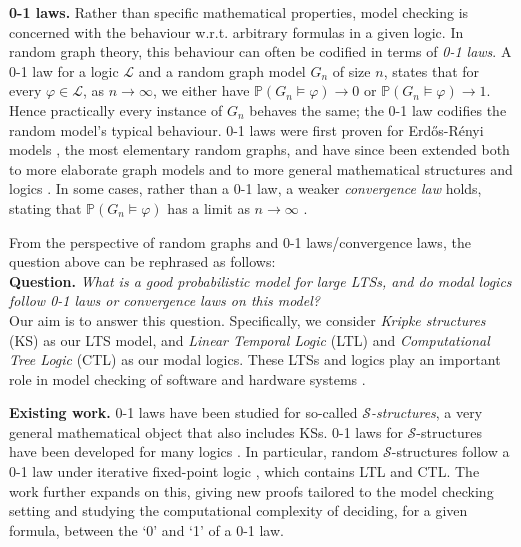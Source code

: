 \documentclass[runngingheads]{llncs}
\begin{document}
\noindent \textbf{0-1 laws.} Rather than specific mathematical properties, model checking is concerned with the behaviour w.r.t. arbitrary formulas in a given logic. In random graph theory, this behaviour can often be codified in terms of \emph{0-1 laws}. A 0-1 law for a logic $\mathcal{L}$ and a random graph model $G_n$ of size $n$, states that for every $\varphi \in \mathcal{L}$, as $n \rightarrow \infty$, we either have $\mathbb{P}(G_n \models \varphi) \rightarrow 0$ or $\mathbb{P}(G_n \models \varphi) \rightarrow 1$. Hence practically every instance of $G_n$ behaves the same; the 0-1 law codifies the random model's typical behaviour. 0-1 laws were first proven for Erd\H{o}s-Rényi models \cite{fagin1976probabilities}, the most elementary random graphs, and have since been extended both to more elaborate graph models \cite{shelah1988zero} and to more general mathematical structures and logics \cite{KOLAITIS1992258}. In some cases, rather than a 0-1 law,  a weaker \emph{convergence law} holds, stating that $\mathbb{P}(G_n \models \varphi)$ has a limit as $n \rightarrow \infty$ \cite{lynch2005convergence}.

From the perspective of random graphs and 0-1 laws/convergence laws, the question above can be rephrased as follows:\\

\noindent \textbf{Question.} \emph{What is a good probabilistic model for large LTSs, and do modal logics follow 0-1 laws or convergence laws on this model?}\\

Our aim is to answer this question. Specifically, we consider \emph{Kripke structures} (KS) as our LTS model, and \emph{Linear Temporal Logic} (LTL) and \emph{Computational Tree Logic} (CTL) as our modal logics. These LTSs and logics play an important role in model checking of software and hardware systems \cite{schneider1995verifying,chaki2004state,baier2008principles,classen2010ctl}.

\noindent \textbf{Existing work.} 0-1 laws have been studied for so-called \emph{$\mathcal{S}$-structures}, a very general mathematical object that also includes KSs. 0-1 laws for $\mathcal{S}$-structures have been developed for many logics \cite{Compton,GRANDJEAN1983180,fagin1976probabilities,Kaufmann2001,KAUFMANN1985285}. In particular, random $\mathcal{S}$-structures follow a 0-1 law under iterative fixed-point logic \cite{BLASS198570}, which contains LTL and CTL. The work \cite{dong20250} further expands on this, giving new proofs tailored to the model checking setting and studying the computational complexity of deciding, for a given formula, between the `0' and `1' of a 0-1 law.
\end{document}
